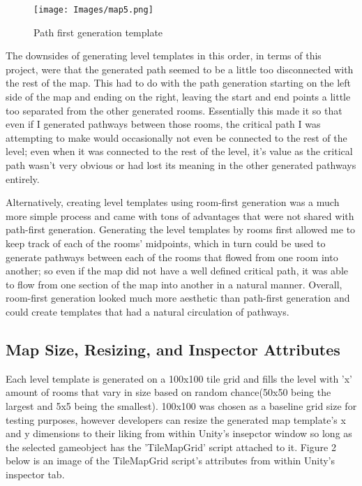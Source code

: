 \documentclass[10pt,twocolumn]{article}
\begin{document}
\begin{figure}[h]
\centering
\texttt{[image: Images/map5.png]}
\caption{Path first generation template}
\label{fig:x path first generation}
\end{figure}

The downsides of generating level templates in this order, in terms of this project, were that the generated path seemed to be a little too disconnected with the rest of the map. This had to do with the path generation starting on the left side of the map and ending on the right, leaving the start and end points a little too separated from the other generated rooms. Essentially this made it so that even if I generated pathways between those rooms, the critical path I was attempting to make would occasionally not even be connected to the rest of the level; even when it was connected to the rest of the level, it's value as the critical path wasn't very obvious or had lost its meaning in the other generated pathways entirely. 

Alternatively, creating level templates using room-first generation was a much more simple process and came with tons of advantages that were not shared with path-first generation. Generating the level templates by rooms first allowed me to keep track of each of the rooms' midpoints, which in turn could be used to generate pathways between each of the rooms that flowed from one room into another; so even if the map did not have a well defined critical path, it was able to flow from one section of the map into another in a natural manner. Overall, room-first generation looked much more aesthetic than path-first generation and could create templates that had a natural circulation of pathways. 

\subsection{Map Size, Resizing, and Inspector Attributes}

Each level template is generated on a 100x100 tile grid and fills the level with 'x' amount of rooms that vary in size based on random chance(50x50 being the largest and 5x5 being the smallest). 100x100 was chosen as a baseline grid size for testing purposes, however developers can resize the generated map template's x and y dimensions to their liking from within Unity's insepctor window so long as the selected gameobject has the 'TileMapGrid' script attached to it. Figure 2 below is an image of the TileMapGrid script's attributes from within Unity's inspector tab.
\end{document}
